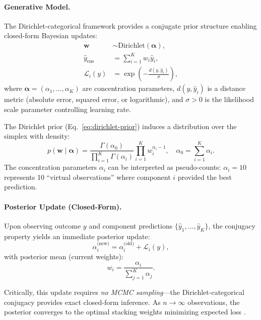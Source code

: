 \paragraph{Generative Model.}
The Dirichlet-categorical framework provides a conjugate prior structure enabling closed-form Bayesian updates:
\begin{align}
\mathbf{w} &\sim \text{Dirichlet}(\boldsymbol{\alpha}), \label{eq:dirichlet-prior}\\
\hat{y}_{\text{ens}} &= \sum_{i=1}^K w_i \hat{y}_i, \label{eq:ensemble-pred}\\
\mathcal{L}_i(y) &= \exp\left(-\frac{d(y, \hat{y}_i)}{\sigma}\right), \label{eq:likelihood-scoring}
\end{align}
where $\boldsymbol{\alpha} = (\alpha_1, \ldots, \alpha_K)$ are concentration parameters, $d(y, \hat{y}_i)$ is a distance metric (absolute error, squared error, or logarithmic), and $\sigma > 0$ is the likelihood scale parameter controlling learning rate.

The Dirichlet prior (Eq.~\ref{eq:dirichlet-prior}) induces a distribution over the simplex with density:
\begin{equation}
p(\mathbf{w} \mid \boldsymbol{\alpha}) = \frac{\Gamma(\alpha_0)}{\prod_{i=1}^K \Gamma(\alpha_i)} \prod_{i=1}^K w_i^{\alpha_i - 1}, \quad \alpha_0 = \sum_{i=1}^K \alpha_i.
\end{equation}
The concentration parameters $\alpha_i$ can be interpreted as pseudo-counts: $\alpha_i = 10$ represents 10 ``virtual observations'' where component $i$ provided the best prediction.

\paragraph{Posterior Update (Closed-Form).}
Upon observing outcome $y$ and component predictions $\{\hat{y}_1, \ldots, \hat{y}_K\}$, the conjugacy property yields an immediate posterior update:
\begin{equation}
\label{eq:dirichlet-update}
\alpha_i^{\text{(new)}} = \alpha_i^{\text{(old)}} + \mathcal{L}_i(y),
\end{equation}
with posterior mean (current weights):
\begin{equation}
\label{eq:posterior-mean-weights}
w_i = \frac{\alpha_i}{\sum_{j=1}^K \alpha_j}.
\end{equation}

Critically, this update requires \emph{no MCMC sampling}---the Dirichlet-categorical conjugacy provides exact closed-form inference. As $n \to \infty$ observations, the posterior converges to the optimal stacking weights minimizing expected loss \citep{yao2018}.

